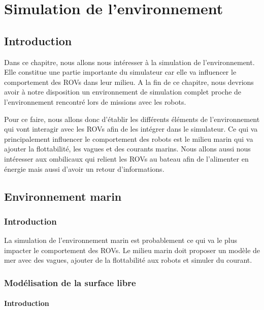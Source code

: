 \chapter{Simulation de l'environnement}
\label{chapitre:environnement}
	
	\section{Introduction}

		Dans ce chapitre, nous allons nous intéresser à la simulation de l'environnement. Elle constitue une partie importante du simulateur car elle va influencer le comportement des \gls{ROV}s dans leur milieu.  A la fin de ce chapitre, nous devrions avoir à notre disposition un environnement de simulation complet proche de l'environnement rencontré lors de missions avec les robots.

		Pour ce faire, nous allons donc d'établir les différents éléments de l'environnement qui vont interagir avec les \gls{ROV}s afin de les intégrer dans le simulateur. Ce qui va principalement influencer le comportement des robots est le milieu marin qui va ajouter la flottabilité, les vagues et des courants marins. Nous allons aussi nous intéresser aux ombilicaux qui relient les \gls{ROV}s au bateau afin de l'alimenter en énergie mais aussi d'avoir un retour d'informations.
		
	\section{Environnement marin}

		\subsection{Introduction}
			
			La simulation de l'environnement marin est probablement ce qui va le plus impacter le comportement des \gls{ROV}s. Le milieu marin doit proposer un modèle de mer avec des vagues, ajouter de la flottabilité aux robots et simuler du courant.

		\subsection{Modélisation de la surface libre}

			\subsubsection{Introduction}

